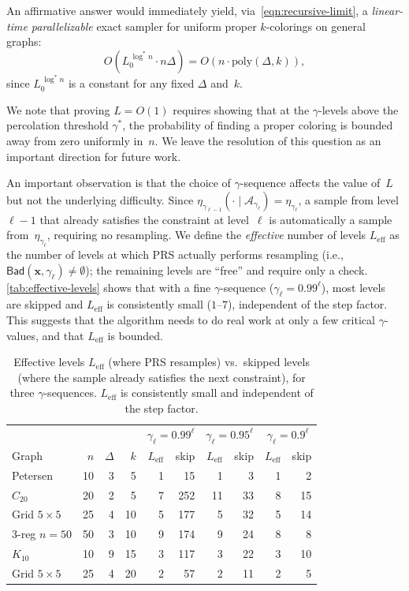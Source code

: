 \documentclass[12pt, a4paper]{article}
\theoremstyle{plain}
\theoremstyle{definition}
\theoremstyle{remark}
\newcommand{\mc}{\mathcal}
\renewcommand{\v}[1]{\boldsymbol{#1}}
\newcommand{\mx}{\v{x}}
\newcommand{\lt}{\left}
\newcommand{\rt}{\right}
\newcommand{\bad}{\mathsf{Bad}}
\begin{document}
An affirmative answer would immediately yield, via~\eqref{eqn:recursive-limit}, a {\em linear-time parallelizable} exact sampler for uniform proper \(k\)-colorings on general graphs:
\[
O\!\lt(L_0^{\,\log^*\! n}\cdot n\Delta\rt) = O(n\cdot\mathrm{poly}(\Delta,k)),
\]
since \(L_0^{\,\log^*\! n}\) is a constant for any fixed \(\Delta\) and~\(k\).

We note that proving \(L = O(1)\) requires showing that at the \(\gamma\)-levels above the percolation threshold \(\gamma^*\), the probability of finding a proper coloring is bounded away from zero uniformly in~\(n\). We leave the resolution of this question as an important direction for future work.

An important observation is that the choice of \(\gamma\)-sequence affects the value of~\(L\) but not the underlying difficulty. Since \(\eta_{\gamma_{{\ell}-1}}(\cdot\mid\mc A_{\gamma_\ell})=\eta_{\gamma_\ell}\), a sample from level \(\ell-1\) that already satisfies the constraint at level~\(\ell\) is automatically a sample from~\(\eta_{\gamma_\ell}\), requiring no resampling. We define the {\em effective} number of levels \(L_{\mathrm{eff}}\) as the number of levels at which PRS actually performs resampling (i.e., \(\bad(\mx,\gamma_\ell)\neq\emptyset\)); the remaining levels are ``free'' and require only a check. \autoref{tab:effective-levels} shows that with a fine \(\gamma\)-sequence (\(\gamma_\ell = 0.99^\ell\)), most levels are skipped and \(L_{\mathrm{eff}}\) is consistently small (\(1\)--\(7\)), independent of the step factor. This suggests that the algorithm needs to do real work at only a few critical \(\gamma\)-values, and that \(L_{\mathrm{eff}}\) is bounded.

\begin{table}[ht]
\centering
\begin{tabular}{l r r r | r r | r r | r r}
\hline
 & & & & \multicolumn{2}{c|}{\(\gamma_\ell=0.99^\ell\)} & \multicolumn{2}{c|}{\(\gamma_\ell=0.95^\ell\)} & \multicolumn{2}{c}{\(\gamma_\ell=0.9^\ell\)} \\
Graph & \(n\) & \(\Delta\) & \(k\) & \(L_{\mathrm{eff}}\) & skip & \(L_{\mathrm{eff}}\) & skip & \(L_{\mathrm{eff}}\) & skip \\
\hline
Petersen & 10 & 3 & 5 & 1 & 15 & 1 & 3 & 1 & 2 \\
\(C_{20}\) & 20 & 2 & 5 & 7 & 252 & 11 & 33 & 8 & 15 \\
Grid \(5\!\times\!5\) & 25 & 4 & 10 & 5 & 177 & 5 & 32 & 5 & 14 \\
3-reg \(n\!=\!50\) & 50 & 3 & 10 & 9 & 174 & 9 & 24 & 8 & 8 \\
\(K_{10}\) & 10 & 9 & 15 & 3 & 117 & 3 & 22 & 3 & 10 \\
Grid \(5\!\times\!5\) & 25 & 4 & 20 & 2 & 57 & 2 & 11 & 2 & 5 \\
\hline
\end{tabular}
\caption{Effective levels \(L_{\mathrm{eff}}\) (where PRS resamples) vs.\ skipped levels (where the sample already satisfies the next constraint), for three \(\gamma\)-sequences. \(L_{\mathrm{eff}}\) is consistently small and independent of the step factor.}
\label{tab:effective-levels}
\end{table}
\end{document}

